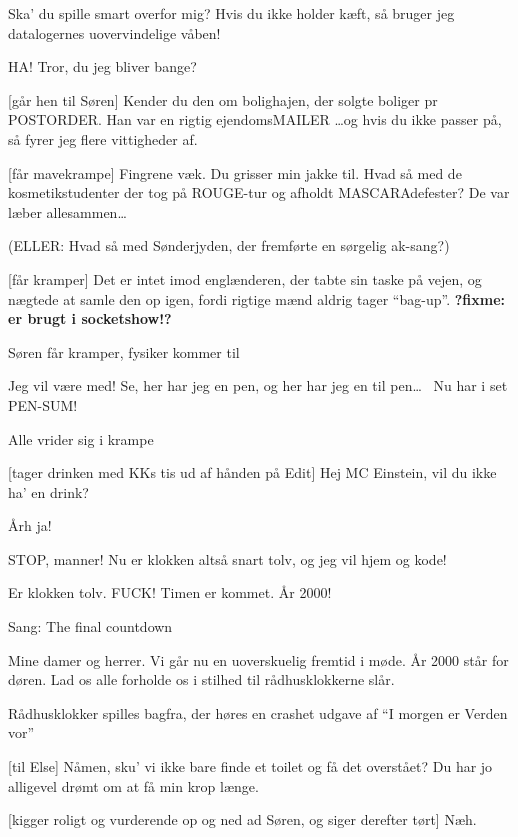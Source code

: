 \documentclass[danish]{article}
\begin{document}
\begin{sketch}
 Ska' du spille smart overfor mig? Hvis du ikke holder kæft, så bruger
jeg datalogernes uovervindelige våben!

 HA! Tror, du jeg bliver bange?

[går hen til Søren] Kender du den om bolighajen, der solgte boliger pr
POSTORDER. Han var en rigtig ejendomsMAILER 
\ldots{}og hvis du ikke passer på, så fyrer jeg flere vittigheder af.

[får mavekrampe] Fingrene væk.  Du grisser min
jakke til.  Hvad så med de kosmetikstudenter
der tog på ROUGE-tur og afholdt MASCARAdefester? De var læber
allesammen\ldots

(ELLER: Hvad så med Sønderjyden, der fremførte en sørgelig ak-sang?)

[får kramper] Det er intet imod englænderen, der tabte sin
taske på vejen, og nægtede at samle den op igen, fordi rigtige mænd
aldrig tager ``bag-up''. \textbf{?fixme: er brugt i socketshow!?}

\scene Søren får kramper, fysiker kommer til

 Jeg vil være med! Se, her har jeg en pen, og her har jeg en
til pen\ldots\  Nu har i
set PEN-SUM!

\scene Alle vrider sig i krampe

[tager drinken med KKs tis ud af hånden på Edit] Hej MC Einstein,
vil du ikke ha' en drink? 

 Årh ja!

 STOP, manner! Nu er klokken altså snart tolv, og jeg vil hjem og kode!

 Er klokken tolv. FUCK!  Timen er kommet. År 2000!

\scene Sang: The final countdown

 Mine damer og herrer. Vi går nu en uoverskuelig fremtid i
møde. År 2000 står for døren. Lad os alle forholde os i stilhed til
rådhusklokkerne slår.

\scene Rådhusklokker spilles bagfra, der høres en crashet udgave af ``I morgen er Verden vor''

[til Else] Nåmen, sku' vi ikke bare finde et toilet og få det
overstået? Du har jo alligevel drømt om at få min krop længe.

[kigger roligt og vurderende op og ned ad Søren, og siger
derefter tørt] Næh.


\end{sketch}
\end{document}
